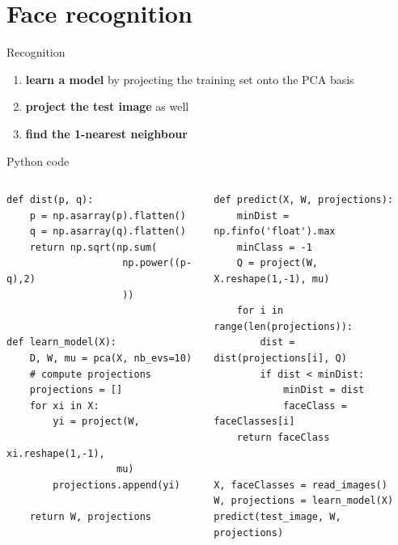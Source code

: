 \documentclass[compress]{beamer}
\begin{document}
\section[Face recognition]{Face recognition}



\begin{frame}{Recognition}

    \begin{enumerate}
        \item \textbf{learn a model} by projecting the training set onto the PCA
            basis
        \item \textbf{project the test image} as well
        \item \textbf{find the 1-nearest neighbour}
    \end{enumerate}
\end{frame}

\begin{frame}[fragile]{Python code}


    \begin{columns}
        \begin{column}{0.5\linewidth}
\begin{verbatim}
def dist(p, q):
    p = np.asarray(p).flatten()
    q = np.asarray(q).flatten()
    return np.sqrt(np.sum(
                    np.power((p-q),2)
                    ))


def learn_model(X):
    D, W, mu = pca(X, nb_evs=10)
    # compute projections
    projections = []
    for xi in X:
        yi = project(W,
                   xi.reshape(1,-1), 
                   mu)
        projections.append(yi)

    return W, projections
\end{verbatim}

        \end{column}
        \begin{column}{0.5\linewidth}


\begin{verbatim}
def predict(X, W, projections):
    minDist = np.finfo('float').max
    minClass = -1
    Q = project(W, X.reshape(1,-1), mu)

    for i in range(len(projections)):
        dist = dist(projections[i], Q)
        if dist < minDist:
            minDist = dist
            faceClass = faceClasses[i]
    return faceClass


X, faceClasses = read_images()
W, projections = learn_model(X)
predict(test_image, W, projections)

\end{verbatim}
        \end{column}
    \end{columns}

\end{frame}
\end{document}
